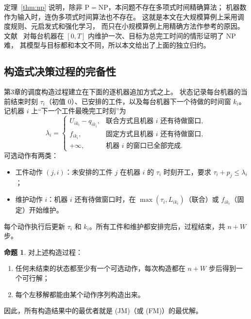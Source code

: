 \documentclass[11pt,oneside,notitlepage]{ctexrep}
\theoremstyle{definition}
\newtheorem{proposition}[definition]{命题}
\theoremstyle{remark}
\begin{document}
定理~\ref{thm:np} 说明，除非 $\mathrm{P}=\mathrm{NP}$，本问题不存在多项式时间精确算法；
机器数作为输入时，连伪多项式时间算法也不存在。
这就是本文在大规模算例上采用调度规则、元启发式和强化学习，
而只在小规模算例上用精确方法作参考的原因。
文献~\cite{lee2000} 对每台机器在 $[0,T]$ 内维护一次、目标为总完工时间的情形证明了 NP 难，
其模型与目标都和本文不同，所以本文给出了上面的独立归约。

\subsection{构造式决策过程的完备性}\label{sec:env}

第3章的调度构造过程建立在下面的逐机器追加方式之上。
状态记录每台机器的当前结束时刻 $\tau_i$（初值 0）、已安排的工件，以及每台机器下一个待做的时间窗 $k_i$。
记机器 $i$ 上“下一个工件最晚完工时刻”为
\[
\lambda_i=
\begin{cases}
U_{ik_i}-q_{ik_i}, & \text{联合方式且机器 $i$ 还有待做窗口},\\
f_{ik_i}, & \text{固定方式且机器 $i$ 还有待做窗口},\\
+\infty, & \text{机器 $i$ 的窗口已全部完成}.
\end{cases}
\]
可选动作有两类：
\begin{itemize}[nosep]
  \item 工件动作 $(j,i)$：未安排的工件 $j$ 在机器 $i$ 的 $\tau_i$ 时刻开工，要求 $\tau_i+p_j\le\lambda_i$；
  \item 维护动作 $i$：机器 $i$ 还有待做窗口时，在 $\max(\tau_i,L_{ik_i})$（联合）或 $f_{ik_i}$（固定）开始维护。
\end{itemize}
每个动作执行后更新 $\tau_i$ 和 $k_i$。所有工件和维护都安排完后，过程结束，共 $n+W$ 步。

\begin{proposition}\label{prop:env}
对上述构造过程：
\begin{enumerate}[label=(\roman*),nosep]
  \item 任何未结束的状态都至少有一个可选动作，每次构造都在 $n+W$ 步后得到一个可行解；
  \item 每个左移解都能由某个动作序列构造出来。
\end{enumerate}
因此，所有构造结果中的最优者就是 (JM)（或 (FM)）的最优解。
\end{proposition}
\end{document}
